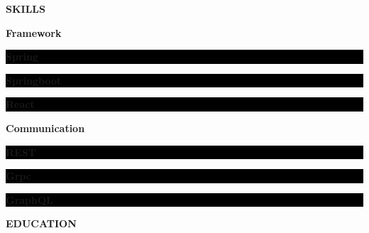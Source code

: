 \documentclass[10pt, a4paper]{article}
\begin{document}
    \vspace*{0.5in}
    {\large {} \enspace \textbf{SKILLS}} \par

    \vspace*{0.1in}
    {\textbf{Framework}} \par
    {\color{white}\colorbox{black}{\strut \textbf{Spring}} \color{white}\colorbox{black}{\strut \textbf{Springboot}} \color{white}\colorbox{black}{\strut \textbf{React}}} \par
    
    \vspace*{0.1in}
    {\textbf{Communication}} \par
    {\color{white}\colorbox{black}{\strut \textbf{REST}} \color{white}\colorbox{black}{\strut \textbf{Grpc}} \color{white}\colorbox{black}{\strut \textbf{GraphQL}}} \par

    \vspace*{0.5in}
    {\large {} \enspace \textbf{EDUCATION}} \par
\end{document}
